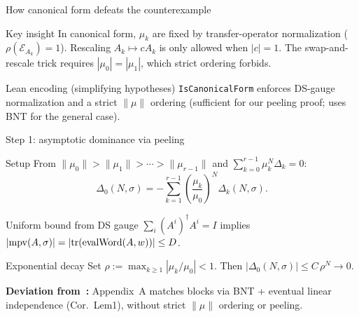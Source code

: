 \documentclass[aspectratio=169,10pt]{beamer}
\newcommand{\cE}{\mathcal{E}}
\begin{document}
\begin{frame}{How canonical form defeats the counterexample}
    \vspace{-0.6em}

    \begin{block}{Key insight}
        In canonical form, $\mu_k$ are fixed by transfer-operator normalization
        ($\rho(\cE_{A_k})=1$).
        Rescaling $A_k\mapsto cA_k$ is only allowed when $|c|=1$.
        The swap-and-rescale trick requires $|\mu_0|=|\mu_1|$,
        which \alert{strict ordering forbids}.
    \end{block}

    \begin{block}{Lean encoding (simplifying hypotheses)}
        \texttt{IsCanonicalForm} enforces DS-gauge normalization and a strict $\|\mu\|$ ordering
        \textcolor{dimwhite}{\footnotesize(sufficient for our peeling proof; \cite{Cirac2017Annals} uses BNT for the general case).}
    \end{block}
\end{frame}

\begin{frame}{Step 1: asymptotic dominance via peeling}
    \vspace{-0.6em}

    \begin{block}{Setup}
        From $\|\mu_0\|>\|\mu_1\|>\cdots>\|\mu_{r-1}\|$ and
        $\sum_{k=0}^{r-1} \mu_k^N\Delta_k=0$:
        \[
            \Delta_0(N,\sigma) = -\sum_{k=1}^{r-1} \left(\frac{\mu_k}{\mu_0}\right)^{\!N} \Delta_k(N,\sigma).
        \]
    \end{block}

    \begin{block}{Uniform bound from DS gauge}
        $\sum_i (A^i)^\dagger A^i=I$ implies
        $|\mathrm{mpv}(A,\sigma)| = |\mathrm{tr}(\mathrm{evalWord}(A,w))| \le D$.
    \end{block}

    \begin{block}{Exponential decay}
        Set $\rho := \max_{k\ge 1}|\mu_k/\mu_0|<1$. Then $|\Delta_0(N,\sigma)| \le C\,\rho^N \to 0$.
    \end{block}

    \textcolor{dimwhite}{\footnotesize \textbf{Deviation from~\cite{Cirac2017Annals}:} Appendix~A matches blocks via BNT + eventual linear independence (Cor.~Lem1), without strict $\|\mu\|$ ordering or peeling.}
\end{frame}
\end{document}
